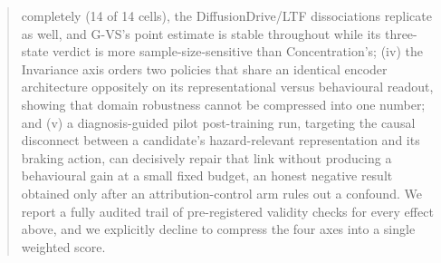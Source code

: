 \begin{abstract}
completely (14 of 14 cells), the DiffusionDrive/LTF dissociations replicate as well,
and G-VS's point estimate is stable throughout while its three-state verdict is more
sample-size-sensitive than Concentration's; (iv) the Invariance axis orders two policies
that share an identical encoder architecture oppositely on its representational versus
behavioural readout, showing that domain robustness cannot be compressed into one number;
and (v) a diagnosis-guided pilot post-training run, targeting the causal disconnect
between a candidate's hazard-relevant representation and its braking action, can
decisively repair that link without producing a behavioural gain at a small fixed
budget, an honest negative result obtained only after an attribution-control arm rules
out a confound. We report a fully audited trail of pre-registered validity checks for
every effect above, and we explicitly decline to compress the four axes into a single
weighted score.
\end{abstract}
